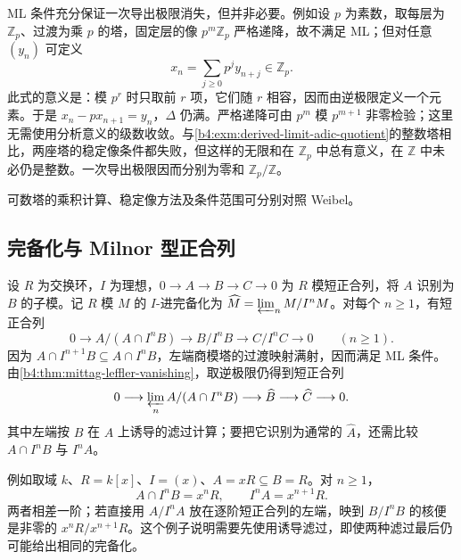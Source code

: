 ML 条件充分保证一次导出极限消失，但并非必要。例如设 \(p\) 为素数，取每层为 \(\mathbb Z_p\)、过渡为乘 \(p\) 的塔，固定层的像 \(p^m\mathbb Z_p\) 严格递降，故不满足 ML；但对任意 \((y_n)\) 可定义
\[
	x_n=\sum_{j\ge0}p^j y_{n+j}\in\mathbb Z_p.
\]
此式的意义是：模 \(p^r\) 时只取前 \(r\) 项，它们随 \(r\) 相容，因而由逆极限定义一个元素。于是 \(x_n-px_{n+1}=y_n\)，\(\Delta\) 仍满。严格递降可由 \(p^m\) 模 \(p^{m+1}\) 非零检验；这里无需使用分析意义的级数收敛。与\cref{b4:exm:derived-limit-adic-quotient}的整数塔相比，两座塔的稳定像条件都失败，但这样的无限和在 \(\mathbb Z_p\) 中总有意义，在 \(\mathbb Z\) 中未必仍是整数。一次导出极限因而分别为零和 \(\mathbb Z_p/\mathbb Z\)。

\ProseParagraphBreak
可数塔的乘积计算、稳定像方法及条件范围可分别对照 Weibel\cite[Definition 3.5.1, Corollary 3.5.4, Definition 3.5.6, Proposition 3.5.7]{Weibel1994HomologicalAlgebra}。

\subsection{完备化与 Milnor 型正合列}
\label{b4:subsec:1304:03}

设 \(R\) 为交换环，\(I\) 为理想，\(0\to A\to B\to C\to0\) 为 \(R\) 模短正合列，将 \(A\) 识别为 \(B\) 的子模。记 \(R\) 模 \(M\) 的 \(I\)-进完备化为 \(\widehat M=\varprojlim_n M/I^nM\)。对每个 \(n\ge1\)，有短正合列
\[
	0\to A/(A\cap I^nB)\to B/I^nB\to C/I^nC\to0\qquad(n\ge1).
\]
因为 \(A\cap I^{n+1}B\subseteq A\cap I^nB\)，左端商模塔的过渡映射满射，因而满足 ML 条件。由\cref{b4:thm:mittag-leffler-vanishing}，取逆极限仍得到短正合列
\[
	0\longrightarrow\varprojlim_n A/(A\cap I^nB) \longrightarrow\widehat B\longrightarrow\widehat C \longrightarrow0.
\]
其中左端按 \(B\) 在 \(A\) 上诱导的滤过计算；要把它识别为通常的 \(\widehat A\)，还需比较 \(A\cap I^nB\) 与 \(I^nA\)。

\ProseParagraphBreak
例如取域 \(k\)、\(R=k[x]\)、\(I=(x)\)、\(A=xR\subseteq B=R\)。对 \(n\ge1\)，
\[
	A\cap I^nB=x^nR,\qquad I^nA=x^{n+1}R.
\]
两者相差一阶；若直接用 \(A/I^nA\) 放在逐阶短正合列的左端，映到 \(B/I^nB\) 的核便是非零的 \(x^nR/x^{n+1}R\)。这个例子说明需要先使用诱导滤过，即使两种滤过最后仍可能给出相同的完备化。

